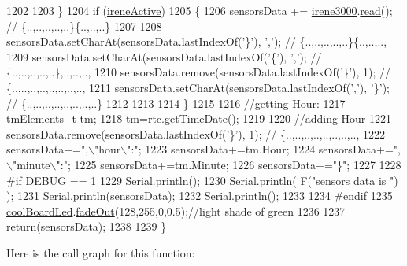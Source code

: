 \begin{DoxyCode}
1202 
1203     \}
1204     \textcolor{keywordflow}{if} (\hyperlink{class_cool_board_a9c3f7ac625481ee2ae802a25d97a4ae0}{ireneActive})
1205     \{
1206         sensorsData += \hyperlink{class_cool_board_ad103718ce316006c4695b8eb312eaf11}{irene3000}.\hyperlink{class_irene3000_a852a170feea994ea1df01c6b245b5d9a}{read}(); \textcolor{comment}{// \{..,..,..,..,..\}\{..,..,..\}}
1207 
1208         sensorsData.setCharAt(sensorsData.lastIndexOf(\textcolor{charliteral}{'\}'}), \textcolor{charliteral}{','}); \textcolor{comment}{// \{..,..,..,..,..\}\{..,..,..,}
1209         sensorsData.setCharAt(sensorsData.lastIndexOf(\textcolor{charliteral}{'\{'}), \textcolor{charliteral}{','}); \textcolor{comment}{// \{..,..,..,..,..\},..,..,..,}
1210         sensorsData.remove(sensorsData.lastIndexOf(\textcolor{charliteral}{'\}'}), 1); \textcolor{comment}{// \{..,..,..,..,..,..,..,..,}
1211         sensorsData.setCharAt(sensorsData.lastIndexOf(\textcolor{charliteral}{','}), \textcolor{charliteral}{'\}'}); \textcolor{comment}{// \{..,..,..,..,..,..,..,..\}      }
1212         
1213         
1214     \}
1215 
1216     \textcolor{comment}{//getting Hour:}
1217     tmElements\_t tm;
1218     tm=\hyperlink{class_cool_board_a50d2a6716879d64a85f3c6b44ad63275}{rtc}.\hyperlink{class_cool_time_a7a7501c5ca77dd1248bea704c44f986c}{getTimeDate}();
1219     
1220     \textcolor{comment}{//adding Hour}
1221     sensorsData.remove(sensorsData.lastIndexOf(\textcolor{charliteral}{'\}'}), 1); \textcolor{comment}{// \{..,..,..,..,..,..,..,..,   }
1222     sensorsData+=\textcolor{stringliteral}{",\(\backslash\)"hour\(\backslash\)":"};  
1223     sensorsData+=tm.Hour;
1224     sensorsData+=\textcolor{stringliteral}{",\(\backslash\)"minute\(\backslash\)":"};
1225     sensorsData+=tm.Minute;
1226     sensorsData+=\textcolor{stringliteral}{"\}"};
1227     
1228 \textcolor{preprocessor}{#if DEBUG == 1}
1229     Serial.println();
1230     Serial.println( F(\textcolor{stringliteral}{"sensors data is "}) );
1231     Serial.println(sensorsData);
1232     Serial.println();
1233 
1234 \textcolor{preprocessor}{#endif}
1235     \hyperlink{class_cool_board_a1b1d3c684a5baa56b08486e192fd8e97}{coolBoardLed}.\hyperlink{class_cool_board_led_a93d545679237e8cc858324367149775c}{fadeOut}(128,255,0,0.5);\textcolor{comment}{//light shade of green}
1236 
1237     \textcolor{keywordflow}{return}(sensorsData);
1238 
1239 \}
\end{DoxyCode}
Here is the call graph for this function\+:\nopagebreak
